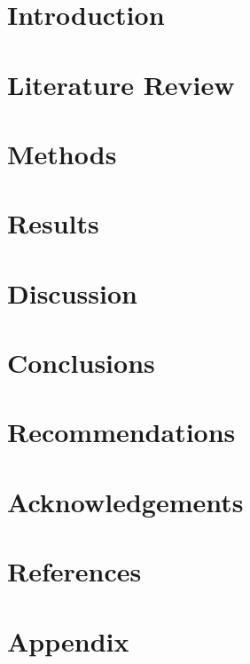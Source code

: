 \documentclass{report}
\newif\iffullsubmission
\begin{document}
    \iffullsubmission
        

        \tableofcontents
        \setcounter{page}{1}

        \chapter{Abstract}
            
    \fi

    \chapter{Introduction}
        
        
    \chapter{Literature Review}
        

    \chapter{Methods}
        

    \chapter{Results}
        

    \chapter{Discussion}
        

    \chapter{Conclusions}
        

    \chapter{Recommendations}
        

    \chapter*{Acknowledgements}
        

    \chapter{References}
    \printbibliography

    \appendix
    \chapter{Appendix}
    
\end{document}
